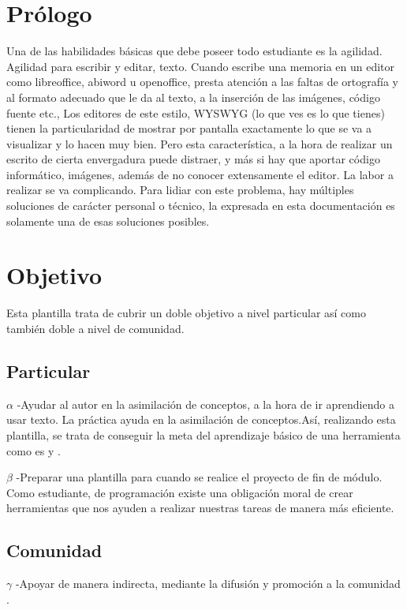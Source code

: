 \section*{Prólogo}

Una de las habilidades básicas que debe poseer todo estudiante es la agilidad. Agilidad para escribir y editar, texto. Cuando escribe una memoria en un editor como libreoffice, abiword u openoffice, presta atención a las faltas de ortografía y al formato adecuado que le da al texto, a la inserción de las imágenes, código fuente etc.,  Los editores de este estilo, WYSWYG (lo que ves es lo que tienes) tienen la particularidad de mostrar por pantalla exactamente lo que se va a visualizar y lo hacen muy bien. Pero esta característica, a la hora de realizar un escrito de cierta envergadura puede distraer, y más si hay que aportar código informático, imágenes, además de no conocer extensamente el editor. La labor a realizar se va complicando. Para lidiar con este problema, hay múltiples soluciones de carácter personal o técnico, la expresada en esta documentación es solamente una de esas soluciones posibles. 
\section*{Objetivo}

Esta plantilla trata de cubrir un doble objetivo a nivel particular así como también doble a nivel de comunidad. 
\subsection*{Particular}

\textbf{$\alpha$} -Ayudar al autor en la asimilación de conceptos, a la hora de ir aprendiendo a usar  texto. La práctica ayuda en la asimilación de conceptos.Así, realizando esta plantilla, se trata de conseguir la meta del aprendizaje básico de una herramienta como es  y .

\textbf{$\beta$}  -Preparar una plantilla para cuando se realice el proyecto de fin de módulo. Como estudiante, de programación existe una obligación moral de crear herramientas que nos ayuden a realizar nuestras tareas de manera más eficiente.


\subsection*{Comunidad}

\textbf{$\gamma$} -Apoyar de manera indirecta, mediante la difusión y promoción a la comunidad .


